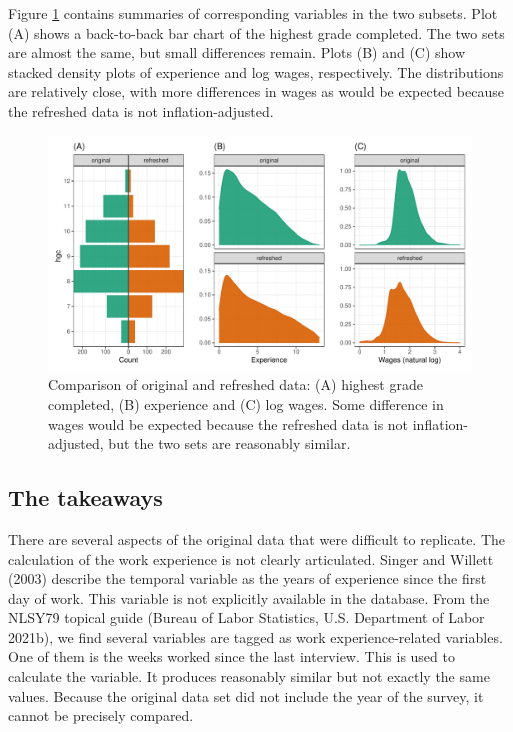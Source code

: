 \documentclass[12pt]{article}
\begin{document}
Figure \ref{fig:compare-subsets} contains summaries of corresponding variables in the two subsets. Plot (A) shows a back-to-back bar chart of the highest grade completed. The two sets are almost the same, but small differences remain. Plots (B) and (C) show stacked density plots of experience and log wages, respectively. The distributions are relatively close, with more differences in wages as would be expected because the refreshed data is not inflation-adjusted.

\begin{figure}

{\centering \includegraphics[width=1\linewidth]{figures/compare-subsets-1} 

}

\caption{Comparison of original and refreshed data: (A) highest grade completed, (B) experience and (C) log wages. Some difference in wages would be expected because the refreshed data is not inflation-adjusted, but the two sets are reasonably similar.}\label{fig:compare-subsets}
\end{figure}

\hypertarget{takeaways}{%
\subsection{The takeaways}\label{takeaways}}

There are several aspects of the original data that were difficult to replicate. The calculation of the work experience is not clearly articulated. Singer and Willett (2003) describe the temporal variable as the years of experience since the first day of work. This variable is not explicitly available in the database. From the NLSY79 topical guide (Bureau of Labor Statistics, U.S. Department of Labor 2021b), we find several variables are tagged as work experience-related variables. One of them is the weeks worked since the last interview. This is used to calculate the variable. It produces reasonably similar but not exactly the same values. Because the original data set did not include the year of the survey, it cannot be precisely compared.
\end{document}
